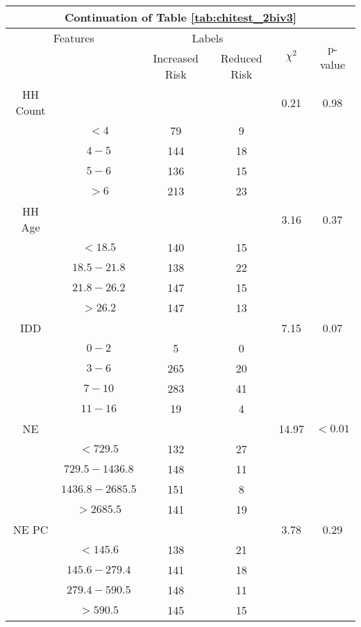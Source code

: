 \begin{table}
\centering
\label{tab:chitest_2biv3_cont}
\begin{tabular}{c c | c c| c | c}
\hline
\multicolumn{6}{c}{Continuation of Table \ref{tab:chitest_2biv3}}\\ 
\hline
\multicolumn{2}{c|}{Features}& \multicolumn{2}{c|}{Labels}& \multirow{2}{*}{$\chi^2$} & \multirow{2}{*}{p-value}\\ 
& & Increased Risk & Reduced Risk & & \\ 
\hline
HH Count &  &  & & 0.21 & 0.98 \\ 
& $< 4$ & 79 & 9& & \\ 
& $4-5$ & 144 & 18& & \\ 
& $5-6$ & 136 & 15& & \\ 
& $> 6$ & 213 & 23& & \\ 
\hline 
HH Age &  &  & & 3.16 & 0.37 \\ 
& $< 18.5$ & 140 & 15& & \\ 
& $18.5-21.8$ & 138 & 22& & \\ 
& $21.8-26.2$ & 147 & 15& & \\ 
& $> 26.2$ & 147 & 13& & \\ 
\hline 
IDD &  &  & & 7.15 & 0.07 \\ 
& $0-2$ & 5 & 0& & \\ 
& $3-6$ & 265 & 20& & \\ 
& $7-10$ & 283 & 41& & \\ 
& $11-16$ & 19 & 4& & \\ 
\hline 
NE &  &  & & 14.97 & $< 0.01$ \\ 
& $< 729.5$ & 132 & 27& & \\ 
& $729.5-1436.8$ & 148 & 11& & \\ 
& $1436.8-2685.5$ & 151 & 8& & \\ 
& $> 2685.5$ & 141 & 19& & \\ 
\hline 
NE PC &  &  & & 3.78 & 0.29 \\ 
& $< 145.6$ & 138 & 21& & \\ 
& $145.6-279.4$ & 141 & 18& & \\ 
& $279.4-590.5$ & 148 & 11& & \\ 
& $> 590.5$ & 145 & 15& & \\ 
\hline 
\end{tabular}
\end{table}

